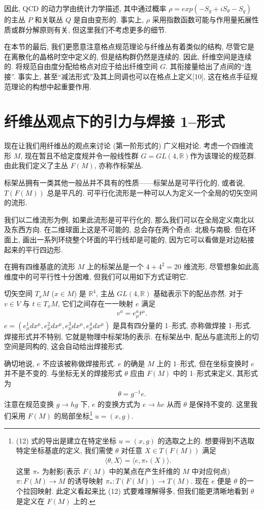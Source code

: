 \documentclass{article}
\begin{document}
\par 因此, QCD 的动力学由统计力学描述, 其中通过概率 $\rho= exp(-S_g +iS_\theta-S_q)$ 的主丛 $P$ 和关联丛 $Q$ 是自由变形的. 事实上, $\rho$ 采用指数函数可能与作用量拓展性质或群分解原则有关, 但这里我们不考虑更多的细节.

\par 在本节的最后, 我们更愿意注意格点规范理论与纤维丛有着类似的结构, 尽管它是在离散化的晶格时空中定义的, 但是结构群仍然是连续的. 因此, 纤维空间是连续的. 将规范自由度分配给格点对应于给出纤维空间 $G$. 其衔接量给出了点间的“连接”. 事实上, 甚至“减法形式”及其上同调也可以在格点上定义[10], 这在格点手征规范理论的构想中起重要作用.
\section{纤维丛观点下的引力与焊接 1--形式}
现在让我们用纤维丛的观点来讨论 (第一阶形式的) 广义相对论. 考虑一个四维流形 $M$, 现在暂且不给定度规并令一般线性群 $G=GL(4,\mathbb{R})$作为该理论的规范群. 由此我们定义了主丛 $F(M)$, 亦称作标架丛.
\par
标架丛拥有一类其他一般丛并不具有的性质——标架丛是可平行化的, 或者说, $T(F(M))$ 总是平凡的. 可平行化流形是一种可以人为定义一个全局的切矢空间的流形.
\par
我们以二维流形为例, 如果此流形是可平行化的, 那么我们可以在全局定义南北以及东西方向. 在二维球面上这是不可能的, 总会存在两个奇点: 北极与南极. 但在环面上, 画出一系列环绕整个环面的平行线却是可能的, 因为它可以看做是对边粘接起来的平行四边形.
\par
在拥有四维基底的流形 $M$ 上的标架丛是一个 $4+4^{2}=20$ 维流形, 尽管想象如此高维度中的可平行性十分困难, 但我们可以用如下方式证明它.
\par
切矢空间 $T_{x}M$ ($x\in M$) 是 $\mathbb{R}^{4}$, 主丛 $GL(4,\mathbb{R})$ 基础表示下的配丛亦然. 对于 $v\in V$ 与 $t\in T_{x}M$, 它们之间存在一一映射 $e$ 满足
\begin{align}
v^{a}=e^{a}_{\mu}t^{\mu}.
\end{align}
$e=(e_{\mu}^{1}dx^{\mu},e_{\mu}^{2}dx^{\mu},e_{\mu}^{3}dx^{\mu},e_{\mu}^{4}dx^{\mu})$ 是具有四分量的 1--形式, 亦称做焊接 1--形式. 焊接形式并不特别, 它就是物理中标架场的表示. 在标架丛中, 配丛与底流形上的切空间是同构的, 这会自动给出焊接形式.
\par
确切地说, $e$ 不应该被称做焊接形式. $e$ 的确是 $M$ 上的 1--形式, 但在坐标变换时 $e$ 并不是不变的. 与坐标无关的焊接形式 $\theta$ 应由 $F(M)$ 中的 1--形式来定义, 其形式为
\begin{align}
\theta=g^{-1}e.
\end{align}
注意在规范变换 $g\rightarrow hg$ 下, $e$ 的变换方式为 $e\rightarrow he$ 从而 $\theta$ 是保持不变的. 这里我们采用 $F(M)$ 的局部坐标\footnote{(12) 式的导出是建立在特定坐标 $u=(x,g)$ 的选取之上的. 想要得到不选取特定坐标基底的定义, 我们需使 $\theta$ 对任意 $X\in T(F(M))$ 满足
\begin{align}
\langle\theta,X\rangle=\langle e,\pi_{*}(X)\rangle.
\end{align}
这里 $\pi_{*}$ 为射影(表示 $F(M)$ 中的某点在产生纤维的 $M$ 中对应何点) $\pi:F(M)\rightarrow M$ 的诱导映射 $\pi_{*}:T(F(M))\rightarrow T(M)$. 现在 $e$ 便是 $\theta$ 的一个拉回映射. 此定义看起来比 (12) 式要难理解得多, 但我们能更清晰地看到 $\theta$ 是定义在 $F(M)$ 上的.} $u=(x,g)$.
\end{document}
